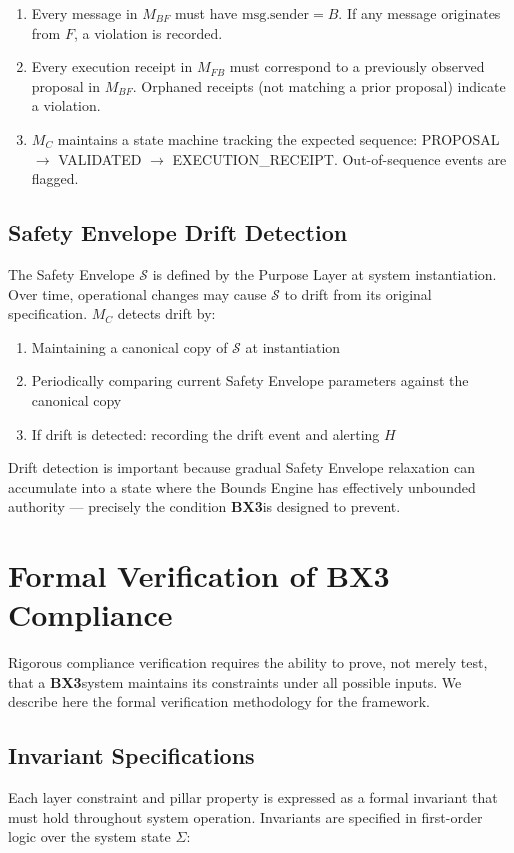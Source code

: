 \documentclass[12pt]{article}
\newcommand{\bxthree}{\textbf{BX3}}
\begin{document}
\begin{enumerate}
\item Every message in $M_{BF}$ must have $\text{msg.sender} = B$. If any message originates from $F$, a violation is recorded.
\item Every execution receipt in $M_{FB}$ must correspond to a previously observed proposal in $M_{BF}$. Orphaned receipts (not matching a prior proposal) indicate a violation.
\item $M_C$ maintains a state machine tracking the expected sequence: PROPOSAL $\rightarrow$ VALIDATED $\rightarrow$ EXECUTION\_RECEIPT. Out-of-sequence events are flagged.
\end{enumerate}

\subsection{Safety Envelope Drift Detection}
The Safety Envelope $\mathcal{S}$ is defined by the Purpose Layer at system instantiation. Over time, operational changes may cause $\mathcal{S}$ to drift from its original specification. $M_C$ detects drift by:

\begin{enumerate}
\item Maintaining a canonical copy of $\mathcal{S}$ at instantiation
\item Periodically comparing current Safety Envelope parameters against the canonical copy
\item If drift is detected: recording the drift event and alerting $H$
\end{enumerate}

Drift detection is important because gradual Safety Envelope relaxation can accumulate into a state where the Bounds Engine has effectively unbounded authority — precisely the condition \bxthree is designed to prevent.

\section{Formal Verification of BX3 Compliance}
\label{sec:verification}

Rigorous compliance verification requires the ability to prove, not merely test, that a \bxthree system maintains its constraints under all possible inputs. We describe here the formal verification methodology for the framework.

\subsection{Invariant Specifications}
Each layer constraint and pillar property is expressed as a formal invariant that must hold throughout system operation. Invariants are specified in first-order logic over the system state $\Sigma$:
\end{document}
